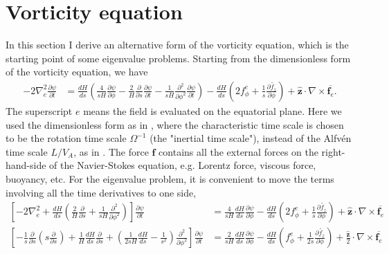 \section{Vorticity equation}

In this section I derive an alternative form of the vorticity equation, which is the starting point of some eigenvalue problems.
Starting from the dimensionless form of the vorticity equation, we have
\begin{equation}
\begin{aligned}
    -2 \nabla_e^2 \frac{\partial \psi}{\partial t} &= \frac{dH}{ds} \left(\frac{4}{sH} \frac{\partial \psi}{\partial \phi} - \frac{2}{H}\frac{\partial}{\partial s} \frac{\partial \psi}{\partial t} - \frac{1}{sH}\frac{\partial^2}{\partial \phi^2}\frac{\partial \psi}{\partial t}\right) - \frac{dH}{ds} \left(2 f_\phi^e + \frac{1}{s}\frac{\partial \widetilde{f_z}}{\partial \phi}\right) + \hat{\mathbf{z}}\cdot \nabla\times \overline{\mathbf{f}_e}.
\end{aligned}
\end{equation}
The superscript $e$ means the field is evaluated on the equatorial plane. Here we used the dimensionless form as in \textcite{jackson_plesio-geostrophy_2020}, where the characteristic time scale is chosen to be the rotation time scale $\Omega^{-1}$ (the "inertial time scale"), instead of the Alfvén time scale $L/V_A$, as in \textcite{holdenried-chernoff_long_2021}. The force $\mathbf{f}$ contains all the external forces on the right-hand-side of the Navier-Stokes equation, e.g. Lorentz force, viscous force, buoyancy, etc. For the eigenvalue problem, it is convenient to move the terms involving all the time derivatives to one side, 
\[\begin{aligned}
    \left[-2 \nabla_e^2 + \frac{dH}{ds} \left(\frac{2}{H} \frac{\partial}{\partial s} + \frac{1}{sH} \frac{\partial^2}{\partial \phi^2}\right)\right] \frac{\partial \psi}{\partial t} &= \frac{4}{sH}\frac{dH}{ds} \frac{\partial \psi}{\partial \phi} - \frac{dH}{ds} \left(2 f_\phi^e + \frac{1}{s}\frac{\partial \widetilde{f_z}}{\partial \phi}\right) + \hat{\mathbf{z}}\cdot \nabla\times \overline{\mathbf{f}_e} \\ 
    \left[- \frac{1}{s}\frac{\partial}{\partial s}\left(s\frac{\partial}{\partial s}\right) + \frac{1}{H} \frac{dH}{ds} \frac{\partial}{\partial s} + \left(\frac{1}{2sH} \frac{dH}{ds} - \frac{1}{s^2}\right)\frac{\partial^2}{\partial \phi^2}\right] \frac{\partial \psi}{\partial t} &= \frac{2}{sH}\frac{dH}{ds} \frac{\partial \psi}{\partial \phi} - \frac{dH}{ds} \left(f_\phi^e + \frac{1}{2s}\frac{\partial \widetilde{f_z}}{\partial \phi}\right) + \frac{\hat{\mathbf{z}}}{2}\cdot \nabla\times \overline{\mathbf{f}_e}
\end{aligned}\]
